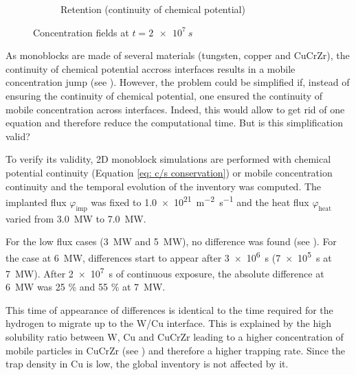 \begin{figure}
\begin{subfigure}{0.5\linewidth}
        \caption{Retention (continuity of chemical potential)}
    \end{subfigure}
    \caption{Concentration fields at $t=\SI{2e7}{s}$}
\end{figure}

As monoblocks are made of several materials (tungsten, copper and CuCrZr), the continuity of chemical potential accross interfaces results in a mobile concentration jump (see ).
However, the problem could be simplified if, instead of ensuring the continuity of chemical potential, one ensured the continuity of mobile concentration across interfaces.
Indeed, this would allow to get rid of one equation and therefore reduce the computational time.
But is this simplification valid?

To verify its validity, 2D monoblock simulations are performed with chemical potential continuity (Equation \ref{eq: c/s conservation}) or mobile concentration continuity and the temporal evolution of the inventory was computed.
The implanted flux $\varphi_\mathrm{imp}$ was fixed to \SI{1.0e21}{m^{-2}.s^{-1}} and the heat flux $\varphi_\mathrm{heat}$ varied from \SI{3.0}{MW} to \SI{7.0}{MW}.

For the low flux cases (\SI{3}{MW} and \SI{5}{MW}), no difference was found (see ).
For the case at \SI{6}{MW}, differences start to appear after \SI{3e6}{s} (\SI{7e5}{s} at \SI{7}{MW}).
After \SI{2e7}{s} of continuous exposure, the absolute difference at \SI{6}{MW} was 25 \% and 55 \% at \SI{7}{MW}.

This time of appearance of differences is identical to the time required for the hydrogen to migrate up to the W/Cu interface.
This is explained by the high solubility ratio between W, Cu and CuCrZr leading to a higher concentration of mobile particles in CuCrZr (see ) and therefore a higher trapping rate.
Since the trap density in Cu is low, the global inventory is not affected by it.


